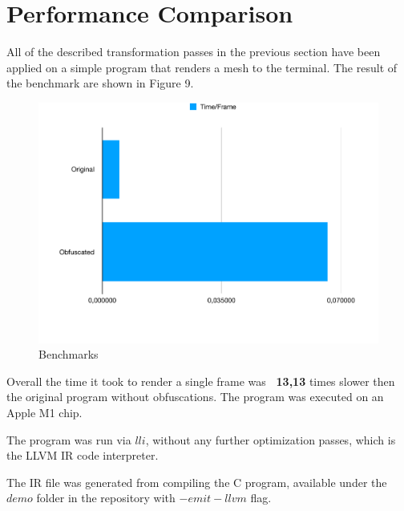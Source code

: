 \section{Performance Comparison}

All of the described transformation passes in the previous section have been applied on a simple program
that renders a mesh to the terminal. The result of the benchmark are shown in Figure 9.

\begin{figure}[!b]
\centering
\includegraphics[width=1\textwidth]{./images/bench.pdf}
\caption{Benchmarks}
\end{figure}

Overall the time it took to render a single frame was \textbf{~13,13} times slower then the original program without
obfuscations. The program was executed on an Apple M1 chip.

The program was run via $lli$, without any further optimization passes, which is the LLVM IR code interpreter.

The IR file was generated from compiling the C program, available under the $demo$ folder in the repository with $-emit-llvm$ flag.